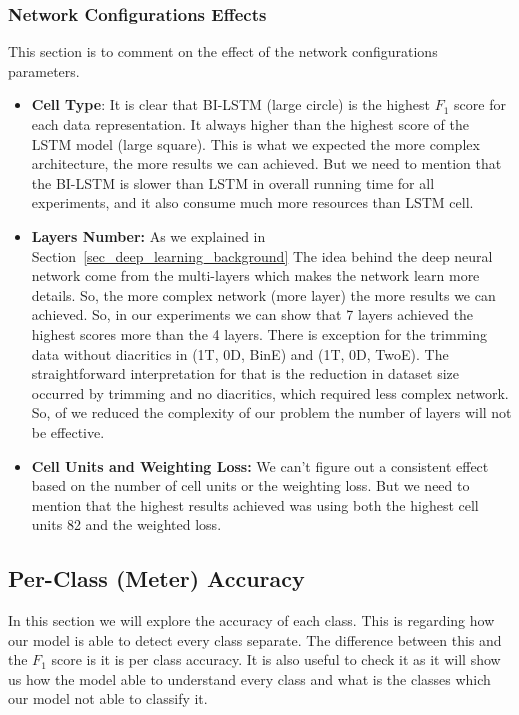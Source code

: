   \newpage
\subsubsection{Network Configurations Effects} 

This section is to comment on the effect of the network configurations parameters.
\begin{itemize}
\item \textbf{Cell Type}: It is clear that BI-LSTM  (large circle) is the highest $F_1$ score for each data representation. It always higher than the highest score of the LSTM model (large square). This is what we expected the more complex architecture, the more results we can achieved. But we need to mention that the BI-LSTM is slower than LSTM in overall running time for all experiments, and it also consume much more resources than LSTM cell.
\item \textbf{Layers Number:} As we explained in Section~\ref{sec_deep_learning_background} The idea behind the deep neural network come from the multi-layers which makes the network learn more details. So, the more complex network (more layer) the more results we can achieved. So, in our experiments we can show that 7 layers achieved the highest scores more than the 4 layers. There is exception for the trimming data without diacritics in (1T, 0D, BinE) and (1T, 0D, TwoE). The straightforward interpretation for that is the reduction in dataset size occurred by trimming and no diacritics, which required less complex network. So, of we reduced the complexity of our problem the number of layers will not be effective.

\item \textbf{Cell Units and Weighting Loss:} We can't figure out a consistent effect based on the number of cell units or the weighting loss. But we need to mention that the highest results achieved was using both the highest cell units 82 and the weighted loss.
  \end{itemize}



\subsection{Per-Class (Meter) Accuracy}

In this section we will explore the accuracy of each class. This is regarding how our model is able to detect every class separate. The difference between this and the $F_1$ score is it is per class accuracy. It is also useful to check it as it will show us how the model able to understand every class and what is the classes which our model not able to classify it. 

